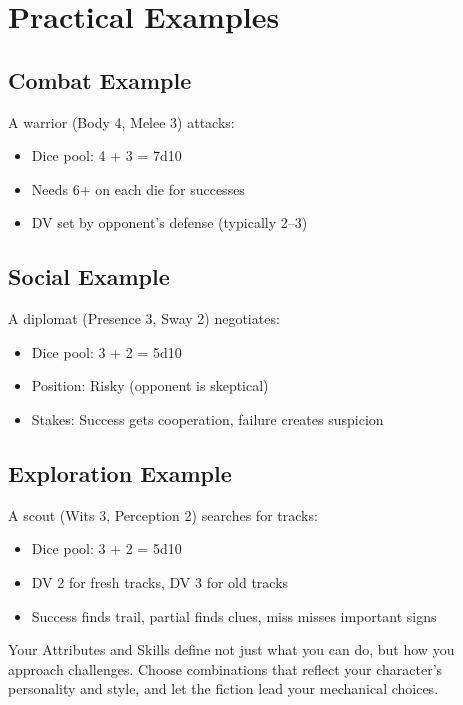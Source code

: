 \documentclass[11pt,twoside,openany]{book}
\begin{document}
\section*{Practical Examples} 

\subsection*{Combat Example}

A warrior (Body 4, Melee 3) attacks:
\begin{itemize}
\item Dice pool: 4 + 3 = 7d10
\item Needs 6+ on each die for successes
\item DV set by opponent's defense (typically 2–3)
\end{itemize}

\subsection*{Social Example}

A diplomat (Presence 3, Sway 2) negotiates:
\begin{itemize}
\item Dice pool: 3 + 2 = 5d10
\item Position: Risky (opponent is skeptical)
\item Stakes: Success gets cooperation, failure creates suspicion
\end{itemize}

\subsection*{Exploration Example}

A scout (Wits 3, Perception 2) searches for tracks:
\begin{itemize}
\item Dice pool: 3 + 2 = 5d10
\item DV 2 for fresh tracks, DV 3 for old tracks
\item Success finds trail, partial finds clues, miss misses important signs
\end{itemize}

\begin{tcolorbox}[colback=gray!5!white, colframe=gray!75!black, title=Final Note, fonttitle=\bfseries]
Your Attributes and Skills define not just what you can do, but how you approach challenges. Choose combinations that reflect your character's personality and style, and let the fiction lead your mechanical choices.
\end{tcolorbox}
\end{document}
